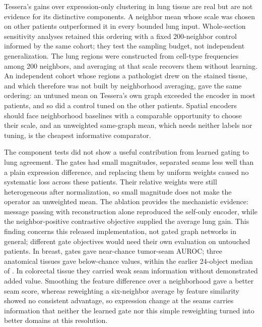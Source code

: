 

Tessera's gains over expression-only clustering in lung tissue are real but are not evidence for its distinctive components. A neighbor mean whose scale was chosen on other patients outperformed it in every bounded lung input. Whole-section sensitivity analyses retained this ordering with a fixed 200-neighbor control informed by the same cohort; they test the sampling budget, not independent generalization. The lung regions were constructed from cell-type frequencies among 200 neighbors, and averaging at that scale recovers them without learning. An independent cohort whose regions a pathologist drew on the stained tissue, and which therefore was not built by neighborhood averaging, gave the same ordering: an untuned mean on Tessera's own graph exceeded the encoder in most patients, and so did a control tuned on the other patients. Spatial encoders should face neighborhood baselines with a comparable opportunity to choose their scale, and an unweighted same-graph mean, which needs neither labels nor tuning, is the cheapest informative comparator.

The component tests did not show a useful contribution from learned gating to lung agreement. The gates had small magnitudes, separated seams less well than a plain expression difference, and replacing them by uniform weights caused no systematic loss across these patients. Their relative weights were still heterogeneous after normalization, so small magnitude does not make the operator an unweighted mean. The ablation provides the mechanistic evidence: message passing with reconstruction alone reproduced the self-only encoder, while the neighbor-positive contrastive objective supplied the average lung gain. This finding concerns this released implementation, not gated graph networks in general; different gate objectives would need their own evaluation on untouched patients. In breast, gates gave near-chance tumor-seam AUROC; three anatomical tissues gave below-chance values, within the earlier 24-object median of \LandGateMedian{}. In colorectal tissue they carried weak seam information without demonstrated added value. Smoothing the feature difference over a neighborhood gave a better seam score, whereas reweighting a six-neighbor average by feature similarity showed no consistent advantage, so expression change at the seams carries information that neither the learned gate nor this simple reweighting turned into better domains at this resolution.

